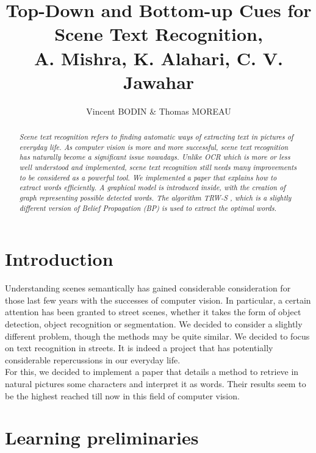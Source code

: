 \documentclass[10pt,a4paper]{article}
\title{Top-Down and Bottom-up Cues for Scene Text Recognition, \\
A. Mishra, K. Alahari, C. V. Jawahar}
\author{Vincent BODIN \& Thomas MOREAU}
\date{}
\begin{document}
\maketitle

\hrulefill
\begin{abstract}
\emph{Scene text recognition refers to finding automatic ways of extracting text in pictures of everyday life. As computer vision is more and more successful, scene text recognition has naturally become a significant issue nowadays. Unlike OCR which is more or less well understood and implemented, scene text recognition still needs many improvements to be considered as a powerful tool. We implemented a paper \cite{Mis} that explains how to extract words efficiently. A graphical model is introduced inside, with the creation of graph representing possible detected words. The algorithm TRW-S \cite{Kol}, which is a slightly different version of Belief Propagation (BP) is used to extract the optimal words.}
\end{abstract}









\section*{Introduction}

Understanding scenes semantically has gained considerable consideration for those last few years with the successes of computer vision. In particular, a certain attention has been granted to street scenes, whether it takes the form of object detection, object recognition or segmentation. We decided to consider a slightly different problem, though the methods may be quite similar. We decided to focus on text recognition in streets. It is indeed a project that has potentially considerable repercussions in our everyday life. \\

For this, we decided to implement a paper \cite{Mis} that details a method to retrieve in natural pictures some characters and interpret it as words. Their results seem to be the highest reached till now in this field of computer vision.






\section{Learning preliminaries}
\end{document}
